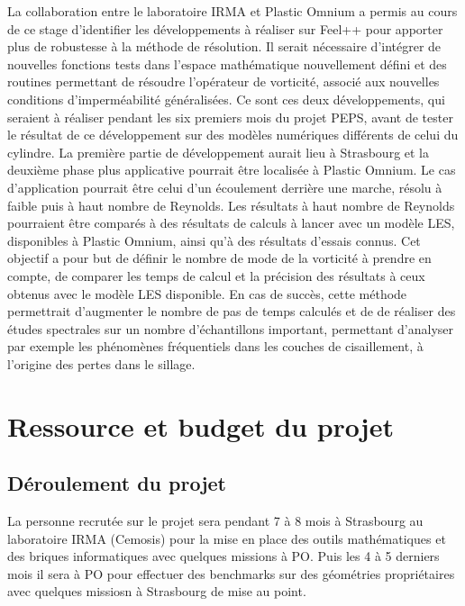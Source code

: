 \documentclass[12pt]{article}
\begin{document}
La collaboration entre le laboratoire IRMA et Plastic Omnium a permis au cours
de ce stage d’identifier les développements à réaliser sur Feel++ pour apporter
plus de robustesse à la méthode de résolution. Il serait nécessaire d’intégrer
de nouvelles fonctions tests dans l’espace mathématique nouvellement défini et
des routines permettant de résoudre l’opérateur de vorticité, associé aux
nouvelles conditions d’imperméabilité généralisées. Ce sont ces deux
développements, qui seraient à réaliser pendant les six premiers mois du projet
PEPS, avant de tester le résultat de ce développement sur des modèles numériques
différents de celui du cylindre. La première partie de développement aurait lieu
à Strasbourg et la deuxième phase plus applicative pourrait être localisée à
Plastic Omnium. Le cas d’application pourrait être celui d’un écoulement
derrière une marche, résolu à faible puis à haut nombre de Reynolds. Les
résultats à haut nombre de Reynolds pourraient être comparés à des résultats de
calculs à lancer avec un modèle LES, disponibles à Plastic Omnium, ainsi qu’à des
résultats d’essais connus. Cet objectif a pour but de définir le nombre de mode
de la vorticité à prendre en compte, de comparer les temps de calcul et la
précision des résultats à ceux obtenus avec le modèle LES disponible. En cas de
succès, cette méthode permettrait d’augmenter le nombre de pas de temps calculés
et de de réaliser des études spectrales sur un nombre d’échantillons important,
permettant d’analyser par exemple les phénomènes fréquentiels dans les couches
de cisaillement, à l’origine des pertes dans le sillage.



\section{Ressource et budget du projet}
\label{sec:budget}

\subsection{Déroulement du projet}
\label{sec:dero-du-proj}

La personne recrutée sur le projet sera pendant 7 à 8 mois à Strasbourg au
laboratoire IRMA (Cemosis) pour la mise en place des outils mathématiques et des
briques informatiques avec quelques missions à PO. Puis les 4 à 5 derniers mois
il sera à PO pour effectuer des benchmarks sur des géométries propriétaires avec
quelques missiosn à Strasbourg de mise au point.
\end{document}

